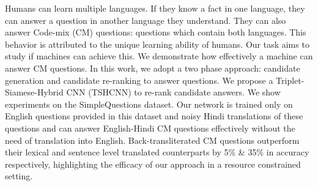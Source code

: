 Humans can learn multiple languages. If they know a fact in one language, they can answer a question in another language they understand. They can also answer Code-mix (CM) questions: questions which contain both languages. This behavior is attributed to the unique learning ability of humans. Our task aims to study if machines can achieve this. We demonstrate how effectively a machine can answer CM questions. In this work, we adopt a two phase approach: candidate generation and candidate re-ranking to answer questions. We propose a Triplet-Siamese-Hybrid CNN (TSHCNN) to re-rank candidate answers. We show experiments on the SimpleQuestions dataset. Our network is trained only on English questions provided in this dataset and noisy Hindi translations of these questions and can answer English-Hindi CM questions effectively without the need of translation into English. Back-transliterated CM questions outperform their lexical and sentence level translated counterparts by 5\% \& 35\% in accuracy respectively, highlighting the efficacy of our approach in a resource constrained setting.
